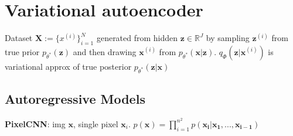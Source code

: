 \section{Variational autoencoder}
Dataset $\mathbf{X}:= \{x^{(i)}\}_{i=1}^N$ generated from hidden $\mathbf{z} \in \mathbb{R}^J$ by sampling $\mathbf{z}^{(i)}$ from true prior $p_{\theta^*}(\mathbf{z})$ and then drawing $\mathbf{x}^{(i)}$ from $p_{\theta^*}(\mathbf{x} | \mathbf{z})$. $q_\Phi(\mathbf{z}|\mathbf{x}^{(i)})$ is variational approx of true posterior $p_{\theta^*}(\mathbf{z} | \mathbf{x})$

\subsection*{Autoregressive Models}
\textbf{PixelCNN}: img $\mathbf{x}$, single pixel $\mathbf{x}_i$. $p(\mathbf{x}) = \prod_{i=1}^{n^2}p(\mathbf{x_i}|\mathbf{x_1}, ..., \mathbf{x_{i-1}})$
